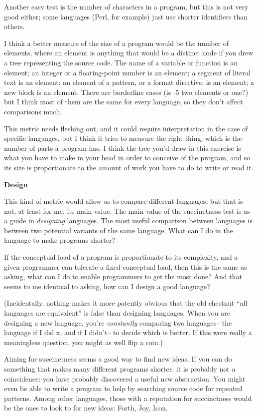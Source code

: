 \documentclass[12pt]{book}
\begin{document}
Another easy test is the number of characters in a program, but this is
not very good either; some languages (Perl, for example) just use
shorter identifiers than others.

I think a better measure of the size of a program would be the number of
elements, where an element is anything that would be a distinct node if
you drew a tree representing the source code. The name of a variable or
function is an element; an integer or a floating-point number is an
element; a segment of literal text is an element; an element of a
pattern, or a format directive, is an element; a new block is an
element. There are borderline cases (is -5 two elements or one?) but I
think most of them are the same for every language, so they don't affect
comparisons much.

This metric needs fleshing out, and it could require interpretation in
the case of specific languages, but I think it tries to measure the
right thing, which is the number of parts a program has. I think the
tree you'd draw in this exercise is what you have to make in your head
in order to conceive of the program, and so its size is proportionate to
the amount of work you have to do to write or read it.

\textbf{Design}

This kind of metric would allow us to compare different languages, but
that is not, at least for me, its main value. The main value of the
succinctness test is as a guide in \emph{designing} languages. The most
useful comparison between languages is between two potential variants of
the same language. What can I do in the language to make programs
shorter?

If the conceptual load of a program is proportionate to its complexity,
and a given programmer can tolerate a fixed conceptual load, then this
is the same as asking, what can I do to enable programmers to get the
most done? And that seems to me identical to asking, how can I design a
good language?

(Incidentally, nothing makes it more patently obvious that the old
chestnut ``all languages are equivalent'' is false than designing
languages. When you are designing a new language, you're
\emph{constantly} comparing two languages-- the language if I did x, and
if I didn't-- to decide which is better. If this were really a
meaningless question, you might as well flip a coin.)

Aiming for succinctness seems a good way to find new ideas. If you can
do something that makes many different programs shorter, it is probably
not a coincidence: you have probably discovered a useful new
abstraction. You might even be able to write a program to help by
searching source code for repeated patterns. Among other languages,
those with a reputation for succinctness would be the ones to look to
for new ideas: Forth, Joy, Icon.
\end{document}
